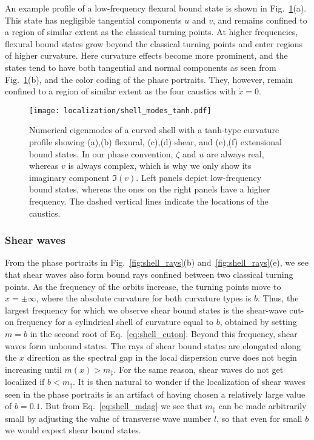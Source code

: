 An example profile of a low-frequency flexural bound state is shown in Fig.~\ref{fig:shell_modes_tanh}(a).
This state has negligible tangential components $u$ and $v$, and remains confined to a region of similar extent as the classical turning points.
At higher frequencies, flexural bound states grow beyond the classical turning points and enter regions of higher curvature.
Here curvature effects become more prominent, and the states tend to have both tangential and normal components as seen from Fig.~\ref{fig:shell_modes_tanh}(b), and the color coding of the phase portraits.
They, however, remain confined to a region of similar extent as the four caustics with $\dot{x} = 0$.
%
\begin{figure}
  \begin{center}
    \texttt{[image: localization/shell\_modes\_tanh.pdf]}
  \end{center}
  \caption{
  Numerical eigenmodes of a curved shell with a tanh-type curvature profile showing (a),(b) flexural, (c),(d) shear, and (e),(f) extensional bound states.
  In our phase convention, $\zeta$ and $u$ are always real, whereas $v$ is always complex, which is why we only show its imaginary component $\Im(v)$.
  Left panels depict low-frequency bound states, whereas the ones on the right panels have a higher frequency.
  The dashed vertical lines indicate the locations of the caustics.
}
  \label{fig:shell_modes_tanh}
\end{figure}

\subsubsection*{Shear waves}

From the phase portraits in Fig.~\ref{fig:shell_rays}(b) and~\ref{fig:shell_rays}(e), we see that shear waves also form bound rays confined between two classical turning points.
As the frequency of the orbits increase, the turning points move to $x = \pm \infty$, where the absolute curvature for both curvature types is $b$.
Thus, the largest frequency for which we observe shear bound states is the shear-wave cut-on frequency for a cylindrical shell of curvature equal to $b$, obtained by setting $m = b$ in the second root of Eq.~\eqref{eq:shell_cuton}.
Beyond this frequency, shear waves form unbound states.
The rays of shear bound states are elongated along the $x$ direction as the spectral gap in the local dispersion curve does not begin increasing until $m(x) > m_{\ddag}$.
For the same reason, shear waves do not get localized if $b < m_{\ddag}$.
It is then natural to wonder if the localization of shear waves seen in the phase portraits is an artifact of having chosen a relatively large value of $b = 0.1$.
But from Eq.~\eqref{eq:shell_mdag} we see that $m_{\ddag}$ can be made arbitrarily small by adjusting the value of transverse wave number $l$, so that even for small $b$ we would expect shear bound states.

